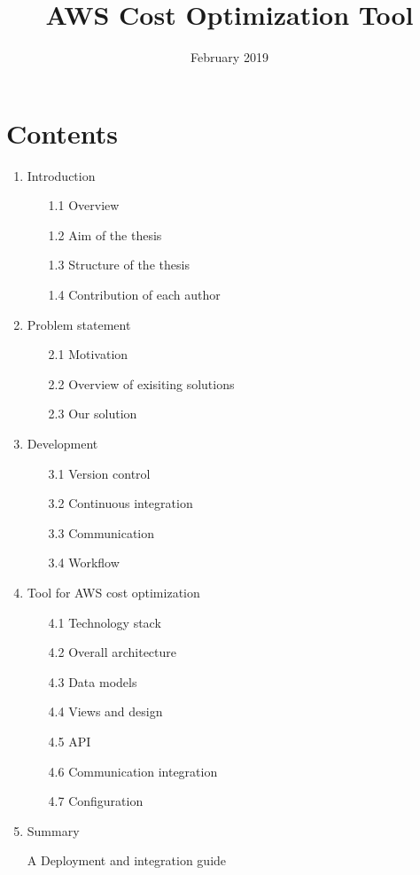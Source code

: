 \documentclass[licencjacka,en]{thesisclass}
\title{AWS Cost Optimization Tool}
\date{February 2019}
\begin{document}
    \maketitle

    \begin{abstract}
        
    \end{abstract}

    \chapter*{Contents}

    \begin{enumerate}
        \item Introduction
        \begin{enumerate}
            \item [1.1] Overview
            \item [1.2] Aim of the thesis
            \item [1.3] Structure of the thesis
            \item [1.4] Contribution of each author
        \end{enumerate}
        \item Problem statement
        \begin{enumerate}
            \item [2.1] Motivation
            \item [2.2] Overview of exisiting solutions
            \item [2.3] Our solution
        \end{enumerate}
        \item Development
        \begin{enumerate}
            \item [3.1] Version control
            \item [3.2] Continuous integration
            \item [3.3] Communication
            \item [3.4] Workflow
        \end{enumerate}
        \item Tool for AWS cost optimization
        \begin{enumerate}
            \item [4.1] Technology stack
            \item [4.2] Overall architecture
            \item [4.3] Data models
            \item [4.4] Views and design
            \item [4.5] API
            \item [4.6] Communication integration
            \item [4.7] Configuration
        \end{enumerate}
        \item Summary
        \item [A] Deployment and integration guide
    \end{enumerate}
\end{document}
